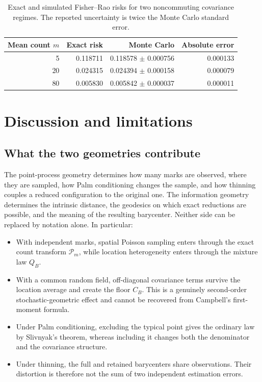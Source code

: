 \documentclass[11pt,a4paper]{article}
\theoremstyle{remark}
\begin{document}
\begin{table}[H]
\centering
\caption{Exact and simulated Fisher--Rao risks for two noncommuting covariance regimes.  The reported uncertainty is twice the Monte Carlo standard error.}
\label{tab:noncommuting}
\begin{tabular}{@{}rrrr@{}}
\toprule
Mean count \(m\) & Exact risk & Monte Carlo & Absolute error \\
\midrule
5  & 0.118711 & 0.118578 $\pm$ 0.000756 & 0.000133 \\
20 & 0.024315 & 0.024394 $\pm$ 0.000158 & 0.000079 \\
80 & 0.005830 & 0.005842 $\pm$ 0.000037 & 0.000011 \\
\bottomrule
\end{tabular}
\end{table}

\section{Discussion and limitations}
\label{sec:discussion}

\subsection{What the two geometries contribute}

The point-process geometry determines how many marks are observed, where they are sampled, how Palm conditioning changes the sample, and how thinning couples a reduced configuration to the original one.  The information geometry determines the intrinsic distance, the geodesics on which exact reductions are possible, and the meaning of the resulting barycenter.  Neither side can be replaced by notation alone.  In particular:

\begin{itemize}
\item With independent marks, spatial Poisson sampling enters through the exact count transform \(\mathscr P_m\), while location heterogeneity enters through the mixture law \(Q_B\).
\item With a common random field, off-diagonal covariance terms survive the location average and create the floor \(C_B\).  This is a genuinely second-order stochastic-geometric effect and cannot be recovered from Campbell's first-moment formula.
\item Under Palm conditioning, excluding the typical point gives the ordinary law by Slivnyak's theorem, whereas including it changes both the denominator and the covariance structure.
\item Under thinning, the full and retained barycenters share observations.  Their distortion is therefore not the sum of two independent estimation errors.
\end{itemize}
\end{document}
